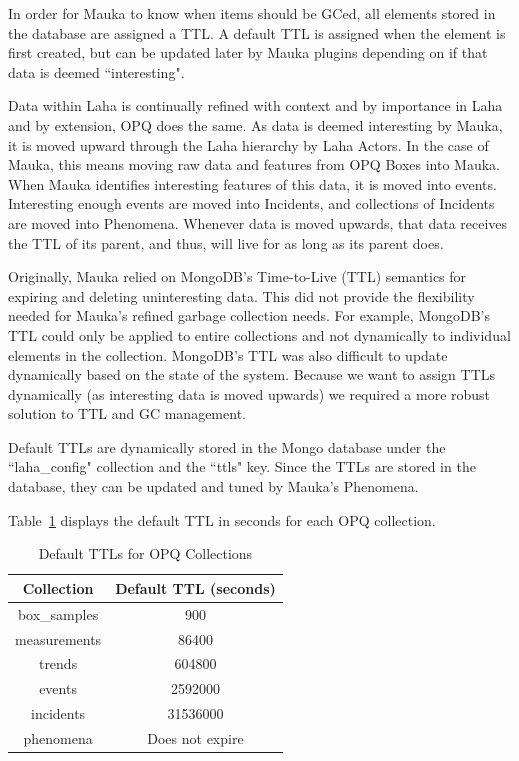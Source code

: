 In order for Mauka to know when items should be GCed, all elements stored in the database are assigned a TTL. A default TTL is assigned when the element is first created, but can be updated later by Mauka plugins depending on if that data is deemed ``interesting".

Data within Laha is continually refined with context and by importance in Laha and by extension, OPQ does the same. As data is deemed interesting by Mauka, it is moved upward through the Laha hierarchy by Laha Actors. In the case of Mauka, this means moving raw data and features from OPQ Boxes into Mauka. When Mauka identifies interesting features of this data, it is moved into events. Interesting enough events are moved into Incidents, and collections of Incidents are moved into Phenomena. Whenever data is moved upwards, that data receives the TTL of its parent, and thus, will live for as long as its parent does.

Originally, Mauka relied on MongoDB's Time-to-Live (TTL) semantics for expiring and deleting uninteresting data. This did not provide the flexibility needed for Mauka's refined garbage collection needs. For example, MongoDB's TTL could only be applied to entire collections and not dynamically to individual elements in the collection. MongoDB's TTL was also difficult to update dynamically based on the state of the system. Because we want to assign TTLs dynamically (as interesting data is moved upwards) we required a more robust solution to TTL and GC management.

Default TTLs are dynamically stored in the Mongo database under the ``laha\_config" collection and the ``ttls" key. Since the TTLs are stored in the database, they can be updated and tuned by Mauka's Phenomena.

Table~\ref{table:DefaultTtls} displays the default TTL in seconds for each OPQ collection.

\begin{table}[H]
	\centering
	\caption{Default TTLs for OPQ Collections}
	\begin{tabular}{|c|c|}
		\hline
		Collection & Default TTL (seconds) \\
		\hline
		box\_samples & 900 \\
		\hline
		measurements & 86400 \\
		\hline
		trends & 604800 \\
		\hline
		events & 2592000 \\
		\hline
		incidents & 31536000 \\
		\hline
		phenomena & Does not expire \\
		\hline
	\end{tabular}
	\label{table:DefaultTtls}
\end{table}

